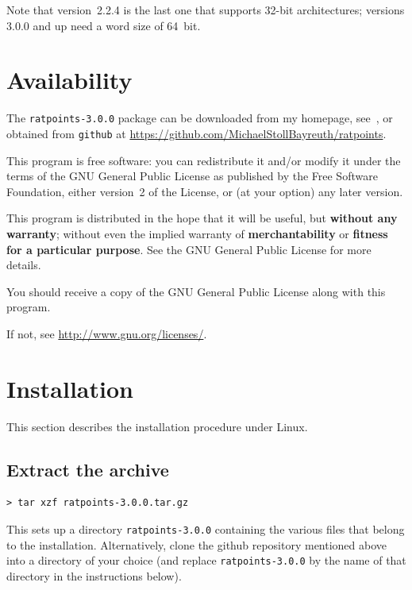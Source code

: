 \documentclass[12pt,a4paper,oneside]{amsart}
\newcommand{\rpversion}{3.0.0} %
\begin{document}
Note that version~2.2.4 is the last one that supports 32-bit architectures;
versions 3.0.0 and up need a word size of 64~bit.


\section{Availability}

The \texttt{ratpoints-\rpversion} package can be downloaded from my homepage,
see~\cite{ratpoints}, or obtained from \texttt{github} at
\url{https://github.com/MichaelStollBayreuth/ratpoints}.

This program is free software: you can redistribute it and/or modify
it under the terms of the GNU General Public License as published
by the Free Software Foundation, either version~2 of the License, or
(at your option) any later version.

This program is distributed in the hope that it will be useful,
but \textbf{without any warranty}; without even the implied warranty of
\textbf{merchantability} or \textbf{fitness for a particular purpose}. See the
GNU General Public License for more details.

You should receive a copy of the GNU General Public License
along with this program.

If not, see \url{http://www.gnu.org/licenses/}.


\section{Installation}

This section describes the installation procedure under Linux.

\subsection{Extract the archive}

\begin{verbatim}
> tar xzf ratpoints-3.0.0.tar.gz
\end{verbatim}

This sets up a directory \texttt{ratpoints-\rpversion} containing the various
files that belong to the installation. Alternatively, clone the github
repository mentioned above into a directory of your choice (and replace
\texttt{ratpoints-\rpversion} by the name of that directory in the instructions below).
\end{document}
